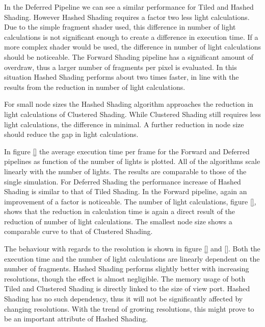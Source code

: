 In the Deferred Pipeline we can see a similar performance for Tiled and Hashed Shading.
However Hashed Shading requires a factor two less light calculations. Due to the simple
fragment shader used, this difference in number of light calculations is not significant
enough to create a difference in execution time. If a more complex shader would be used,
the difference in number of light calculations should be noticeable. The Forward Shading
pipeline has a significant amount of overdraw, thus a larger number of fragments per
pixel is evaluated. In this situation Hashed Shading performs about two times faster,
in line with the results from the reduction in number of light calculations.

For small node sizes the Hashed Shading algorithm approaches the reduction in light calculations
of Clustered Shading. While Clustered Shading still requires less light calculations, the
difference in minimal. A further reduction in node size should reduce the gap in light calculations.

In figure \ref{} the average execution time per frame for the Forward and Deferred pipelines as
function of the number of lights is plotted. All of the algorithms scale linearly with the
number of lights. The results are comparable to those of the single simulation. For Deferred
Shading the performance increase of Hashed Shading is similar to that of Tiled Shading. In
the Forward pipeline, again an improvement of a factor is noticeable.
The number of light calculations, figure \ref{}, shows that the reduction in calculation time
is again a direct result of the reduction of number of light calculations. The smallest node
size shows a comparable curve to that of Clustered Shading.

The behaviour with regards to the resolution is shown in figure \ref{} and \ref{}.
Both the execution time and the number of light calculations are linearly dependent on
the number of fragments. 
Hashed Shading performs slightly better with increasing resolutions, though the effect
is almost negligible. The memory usage of both Tiled and Clustered Shading is directly
linked to the size of view port. Hashed Shading has no such dependency, thus it will not
be significantly affected by changing resolutions. With the trend of growing resolutions,
this might prove to be an important attribute of Hashed Shading.

